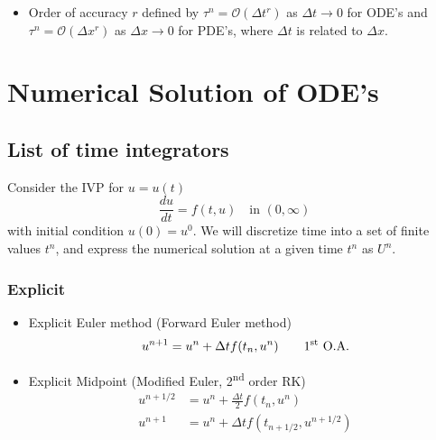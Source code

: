 \documentclass[oneside,a4paper,11pt]{report}
\begin{document}
\begin{itemize}
\item Order of accuracy $r$ defined by $\tau^n = \mathcal{O}(\Delta t^r)$ as $\Delta t \to 0$ for ODE's and $\tau^n = \mathcal{O}(\Delta x^r)$ as $\Delta x \to 0$ for PDE's, where $\Delta t$ is related to $\Delta x$.

\end{itemize}

\part{Numerical Solution of ODE's}

\chapter{List of time integrators}
Consider the IVP for $u=u(t)$
\begin{equation}
\label{eq:ode_generic}
\frac{du}{dt} = f(t, u) \quad \text{in } (0,\infty)
\end{equation}
with initial condition $u(0) = u^0$. We will discretize time into a set of finite values $t^n$, and express the numerical solution at a given time $t^n$ as $U^n$. 

\section{Explicit}
\begin{itemize}

\item Explicit Euler method (Forward Euler method)
\begin{equation}
u^{n+1} = u^n + \Delta t f(t_n, u^n) \qquad \text{1\textsuperscript{st} O.A.}
\end{equation}

\item Explicit Midpoint (Modified Euler, 2\textsuperscript{nd} order RK)
\begin{align}
    u^{n+1/2} &= u^n + \frac{\Delta t}{2} f(t_n, u^n) \nonumber \\
    u^{n+1}   &= u^n + \Delta t f(t_{n+1/2}, u^{n+1/2})
\end{align}

\end{itemize}
\end{document}

